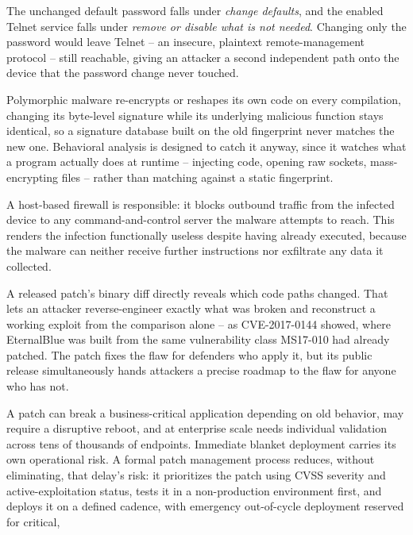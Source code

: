 \begin{answerkey}
\item The unchanged default password falls under \emph{change defaults}, and the enabled Telnet
service falls under \emph{remove or disable what is not needed}. Changing only the password would
leave Telnet -- an insecure, plaintext remote-management protocol -- still reachable, giving an
attacker a second independent path onto the device that the password change never touched.
\item Polymorphic malware re-encrypts or reshapes its own code on every compilation, changing its
byte-level signature while its underlying malicious function stays identical, so a signature
database built on the old fingerprint never matches the new one. Behavioral analysis is designed to
catch it anyway, since it watches what a program actually does at runtime -- injecting code,
opening raw sockets, mass-encrypting files -- rather than matching against a static fingerprint.
\item A host-based firewall is responsible: it blocks outbound traffic from the infected device to
any command-and-control server the malware attempts to reach. This renders the infection
functionally useless despite having already executed, because the malware can neither receive
further instructions nor exfiltrate any data it collected.
\item A released patch's binary diff directly reveals which code paths changed. That lets an
attacker reverse-engineer exactly what was broken and reconstruct a working exploit from the
comparison alone -- as CVE-2017-0144 showed, where EternalBlue was built from the same
vulnerability class MS17-010 had already patched. The patch fixes the flaw for defenders who apply
it, but its public release simultaneously hands attackers a precise roadmap to the flaw for anyone
who has not.
\item A patch can break a business-critical application depending on old behavior, may require a
disruptive reboot, and at enterprise scale needs individual validation across tens of thousands of
endpoints. Immediate blanket deployment carries its own operational risk. A formal patch
management process reduces, without eliminating, that delay's risk: it prioritizes the patch using
CVSS severity and active-exploitation status, tests it in a non-production environment first, and
deploys it on a defined cadence, with emergency out-of-cycle deployment reserved for critical,

\end{answerkey}
